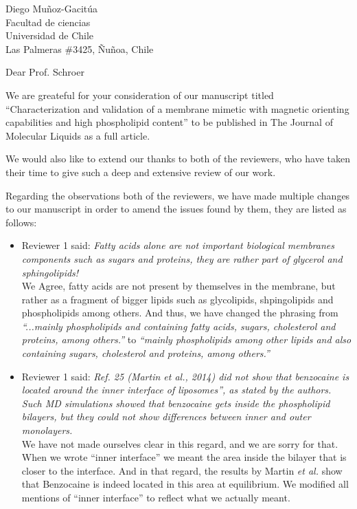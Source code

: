 \documentclass{letter}
\begin{document}
\begin{letter}{Diego Muñoz-Gacitúa\\ Facultad de ciencias \\ Universidad de
    Chile \\ Las Palmeras \#3425, Ñuñoa, Chile}
  
  \opening{Dear Prof. Schroer}
  
  We are greateful for your consideration of our manuscript titled
  ``Characterization and validation of a membrane mimetic with magnetic
  orienting capabilities and high phospholipid content'' to be published in The
  Journal of Molecular Liquids as a full article.
  
  We would also like to extend our thanks to both of the reviewers, who have
  taken their time to give such a deep and extensive review of our work.
  
  Regarding the observations both of the reviewers, we have made multiple changes to
  our manuscript in order to amend the issues found by them, they are listed as
  follows:
  
  \begin{itemize}
  \item Reviewer 1 said: \textit{Fatty acids alone are not important biological membranes components such as sugars and proteins, they are rather part of glycerol and sphingolipids!}\\
    We Agree, fatty acids are not present by themselves in the membrane, but
    rather as a fragment of bigger lipids such as glycolipids, shpingolipids and
    phospholipids among others. And thus, we have changed the phrasing from
    \textit{``...mainly phospholipids and containing fatty acids, sugars,
      cholesterol and proteins, among others.''} to \textit{``mainly phospholipids among other lipids and
      also containing sugars, cholesterol and proteins, among others.''}
    
  \item Reviewer 1 said: \textit{Ref. 25 (Martin et al., 2014) did not show that benzocaine is located around the inner interface of liposomes”, as stated by the authors. Such MD simulations showed that benzocaine gets inside the phospholipid bilayers, but they could not show differences between inner and outer monolayers.}\\
    We have not made ourselves clear in this regard, and we are sorry for that. When we wrote ``inner
    interface'' we meant the area inside the bilayer that is closer to the
    interface. And in that regard, the results by Martin \textit{et al.} show
    that Benzocaine is indeed located in this area at equilibrium. We modified
    all mentions of ``inner interface'' to reflect what we actually meant.
    

\end{itemize}
\end{letter}
\end{document}

